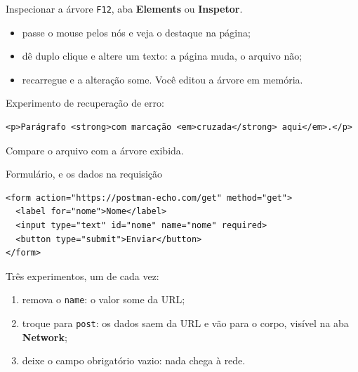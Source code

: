 \documentclass{beamer}
\begin{document}
\begin{frame}[fragile]{Inspecionar a árvore}
  \texttt{F12}, aba \textbf{Elements} ou \textbf{Inspetor}.

  \vspace{0.3cm}
  \begin{itemize}
    \item passe o mouse pelos nós e veja o destaque na página;
    \item dê duplo clique e altere um texto: a página muda, o arquivo não;
    \item recarregue e a alteração some. Você editou a árvore em memória.
  \end{itemize}

  \vspace{0.3cm}
  Experimento de recuperação de erro:

  \begin{verbatim}
<p>Parágrafo <strong>com marcação <em>cruzada</strong> aqui</em>.</p>
  \end{verbatim}

  \small Compare o arquivo com a árvore exibida.
\end{frame}

\begin{frame}[fragile]{Formulário, e os dados na requisição}
  \begin{verbatim}
<form action="https://postman-echo.com/get" method="get">
  <label for="nome">Nome</label>
  <input type="text" id="nome" name="nome" required>
  <button type="submit">Enviar</button>
</form>
  \end{verbatim}

  \vspace{0.2cm}
  Três experimentos, um de cada vez:
  \begin{enumerate}
    \item remova o \texttt{name}: o valor some da URL;
    \item troque para \texttt{post}: os dados saem da URL e vão para o corpo,
          visível na aba \textbf{Network};
    \item deixe o campo obrigatório vazio: nada chega à rede.
  \end{enumerate}
\end{frame}
\end{document}
